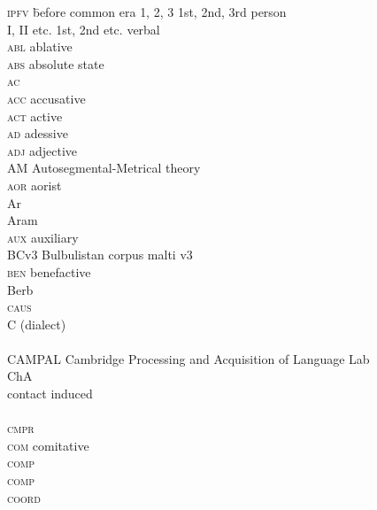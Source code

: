 \begin{refsection}
\printbibliography[heading=subbibliography]


\begin{multicols}{2}
\begin{tabbing}
\textsc{ipfv} \hspace{1.5em} \= before common era\kill
\textsc{1, 2, 3} \> 1st, 2nd, 3rd person \\
I, II etc. \> 1st, 2nd etc. verbal  \\
\textsc{abl} \> ablative \\
\textsc{abs} \> absolute state \\
\textsc{ac} \>  \\
\textsc{acc} \> accusative \\
\textsc{act} \> active \\
\textsc{ad} \> adessive \\
\textsc{adj} \> adjective \\
AM \> Autosegmental-Metrical theory \\
\textsc{aor} \> aorist \\
Ar \>  \\
Aram \>  \\
\textsc{aux} \> auxiliary \\
BCv3 \> Bulbulistan corpus malti v3 \\
\textsc{ben} \> benefactive \\
Berb           \>  \\
\textsc{caus} \>  \\
C \>  (dialect) \\
 \>   \\
CAMPAL \> Cambridge Processing and Acquisition of Language Lab \\
ChA \>   \\
 \> contact induced  \\
 \>   \\
\textsc{cmpr} \>  \\
\textsc{com} \> comitative \\
\textsc{comp} \>  \\
\textsc{comp} \>  \\
\textsc{coord} \>  \\

\end{tabbing}
\end{multicols}
\end{refsection}
